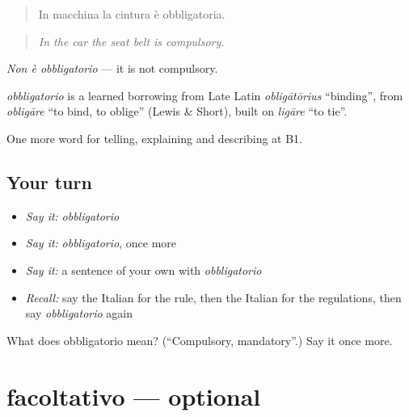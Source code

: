 \begin{quote}
In macchina la cintura è obbligatoria.
\end{quote}

\begin{quote}
\emph{In the car the seat belt is compulsory.}
\end{quote}

\emph{Non è obbligatorio} — it is not compulsory.

\begin{cousinweb}
\emph{obbligatorio} is a learned borrowing from Late Latin \emph{obligātōrius} \textquotedblleft{}binding\textquotedblright{}, from \emph{obligāre} \textquotedblleft{}to bind, to oblige\textquotedblright{} (Lewis \& Short), built on \emph{ligāre} \textquotedblleft{}to tie\textquotedblright{}.
\end{cousinweb}

\begin{grammarlens}[title={What you've built}]
One more word for telling, explaining and describing at B1.
\end{grammarlens}

\subsection*{Your turn}
\begin{itemize}
\raggedright
  \item \emph{Say it:} \emph{obbligatorio}
  \item \emph{Say it:} \emph{obbligatorio}, once more
  \item \emph{Say it:} a sentence of your own with \emph{obbligatorio}
  \item \emph{Recall:} say the Italian for the rule, then the Italian for the regulations, then say \emph{obbligatorio} again
\end{itemize}

\begin{tcolorbox}[breakable,colback=teal!4,colframe=teal!35!black,title={Before you move on}]
What does obbligatorio mean? (\textquotedblleft{}Compulsory, mandatory\textquotedblright{}.) Say it once more.
\end{tcolorbox}
\section[facoltativo]{facoltativo — optional}

\label{lesson:IT-C384-facoltativo}



